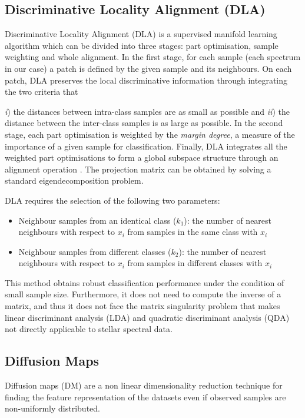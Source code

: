 \documentclass[a4paper,fleqn,usenatbib]{mnras}
\begin{document}
\subsection{Discriminative Locality Alignment (DLA)}
Discriminative Locality Alignment (DLA) \citep{zhang:2008} is a
supervised manifold learning algorithm which can be divided into three
stages: part optimisation, sample weighting and whole alignment. In
the first stage, for each sample (each spectrum in our case) a patch
is defined by the given sample and its neighbours. On each patch, DLA
preserves the local discriminative information through integrating the
two criteria that {\textit{i}) the distances between intra-class
  samples are as small as possible and \textit{ii}) the distance
  between the inter-class samples is as large as possible. In the
  second stage, each part optimisation is weighted by the
  \textit{margin degree}, a measure of the importance of a given
  sample for classification. Finally, DLA integrates all the weighted
  part optimisations to form a global subspace structure through an
  alignment operation \citep{2002cs.......12008Z}. The projection
  matrix can be obtained by solving a standard eigendecomposition
  problem.

DLA requires the selection of the following two parameters:
\begin{itemize}
\item Neighbour samples from an identical class ($k_1$): 
	the number of nearest neighbours with respect to $x_i$
	from samples in the same class with $x_i$
\item Neighbour samples from different classes ($k_2$): 
	the number of nearest neighbours with respect to $x_i$
	from samples in different classes with $x_i$
\end{itemize}

This method obtains robust classification performance under the
condition of small sample size. Furthermore, it does not need to
compute the inverse of a matrix, and thus it does not face the matrix
singularity problem that makes linear discriminant analysis (LDA) and
quadratic discriminant analysis (QDA) not directly applicable to
stellar spectral data.

\subsection{Diffusion Maps}

Diffusion maps (DM) \citep{coifman:06,nadler:06} are a non linear
dimensionality reduction technique for finding the feature
representation of the datasets even if observed samples are
non-uniformly distributed.

}
\end{document}
